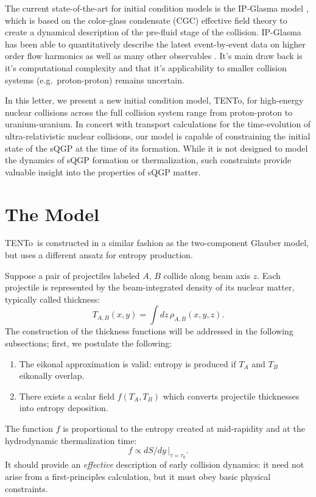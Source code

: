\documentclass[aps,prl,reprint,amsmath,nofootinbib]{revtex4-1}
\newcommand{\trento}{T\raisebox{-.5ex}{R}ENTo}
\begin{document}
The current state-of-the-art for initial condition models is the IP-Glasma model \cite{}, which is based on the color-glass condensate (CGC) effective 
field theory \cite{} to create a dynamical description of the pre-fluid stage of the collision.  IP-Glasma has been able to quantitatively describe the 
latest event-by-event data on higher order flow harmonics as well as many other observables \cite{Schenke:2014zha}. It's main draw back is it's computational 
complexity and that it's applicability to smaller collision systems (e.g.~proton-proton) remains uncertain.

In this letter, we present a new initial condition model, \trento, for high-energy nuclear collisions across the full collision system range from proton-proton 
to uranium-uranium. In concert with transport calculations for the time-evolution of ultra-relativistic nuclear collisions, our model is capable of constraining the 
initial state of the sQGP at the time of its formation. While it is not designed to model the dynamics of sQGP formation or thermalization, such constraints 
provide valuable insight into the properties of sQGP matter.

\section{The Model}

\trento\ is constructed in a similar fashion as the two-component Glauber model, but uses a different ansatz
for entropy production. 

Suppose a pair of projectiles labeled $A$, $B$ collide along beam axis $z$.  Each projectile is represented by
the beam-integrated density of its nuclear matter, typically called thickness:
\begin{equation}
  T_{A,B}(x, y) = \int dz \, \rho_{A,B}(x, y, z).
\end{equation}
The construction of the thickness functions will be addressed in the following subsections; first, we
postulate the following:
\begin{enumerate}
  \item The eikonal approximation is valid:  entropy is produced if $T_A$ and $T_B$ eikonally overlap.
  \item There exists a scalar field $f(T_A, T_B)$ which converts projectile thicknesses into entropy
    deposition.
\end{enumerate}
The function $f$ is proportional to the entropy created at mid-rapidity and at the hydrodynamic thermalization
time:
\begin{equation}
  f \propto dS/dy \, |_{\tau = \tau_0}.
\end{equation}
It should provide an \emph{effective} description of early collision dynamics:  it need not arise from a
first-principles calculation, but it must obey basic physical constraints.
\end{document}
